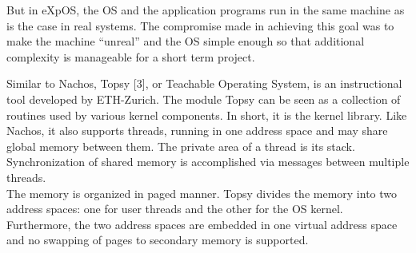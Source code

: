 But in eXpOS, the OS and the application programs run in the same machine as is the case in real systems. The compromise made in achieving this goal was to make the machine “unreal” and the OS simple enough so that additional complexity is manageable for a short term project.

Similar to Nachos, Topsy [3], or Teachable Operating System, is an instructional tool developed by ETH-Zurich. The module Topsy can be seen as a collection of routines used by various kernel components. In short, it is the kernel library. Like Nachos, it also supports threads, running in one address space and may share global memory between them. The private area of a thread is its stack. Synchronization of shared memory is accomplished via messages between multiple threads.\\

The memory is organized in paged manner. Topsy divides the memory into two address spaces: one for user threads and the other for the OS kernel.  Furthermore, the two address spaces are embedded in one virtual address space and no swapping of pages to secondary memory is supported.
